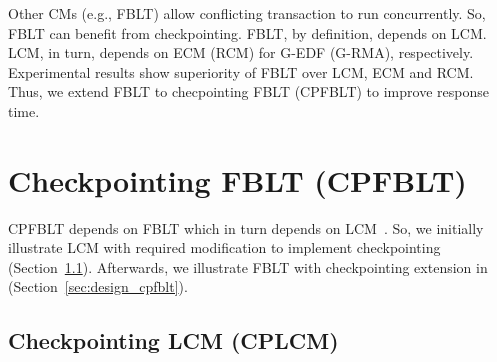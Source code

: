 \documentclass[conference]{IEEEtran}
\begin{document}
Other CMs (e.g., FBLT\cite{fblt}) allow conflicting transaction to run concurrently. So, FBLT can benefit from checkpointing. FBLT, by definition, depends on LCM. LCM, in turn, depends
on ECM (RCM) for G-EDF (G-RMA), respectively. Experimental results
show superiority of FBLT over LCM, ECM and RCM\cite{fblt}. Thus, we extend FBLT to checpointing FBLT (CPFBLT) to improve response time.

\section{Checkpointing FBLT (CPFBLT)}\label{sec:cpfblt_design}

CPFBLT depends on FBLT which in turn depends on LCM~\cite{lcmdac2012}. So, we initially illustrate LCM with required modification to implement checkpointing (Section~\ref{sec:cplcm}). Afterwards, we illustrate FBLT with checkpointing extension in (Section~\ref{sec:design_cpfblt}).

\subsection{Checkpointing LCM (CPLCM)}\label{sec:cplcm}
\end{document}
